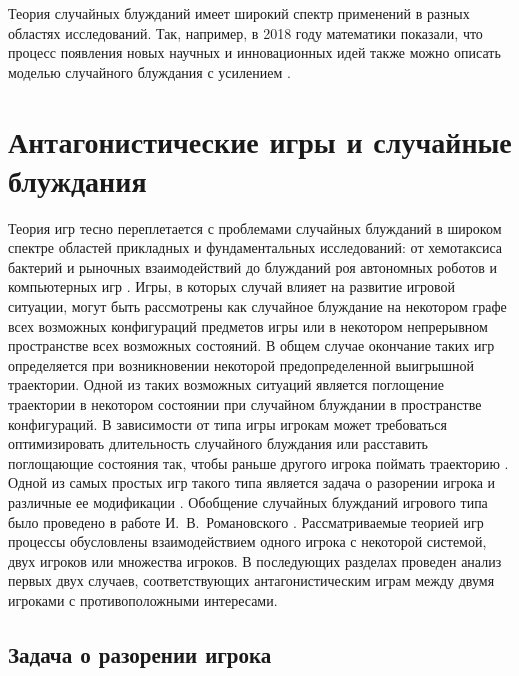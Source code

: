 Теория случайных блужданий имеет широкий спектр применений в разных областях исследований. Так, например, в 2018 году математики показали, что процесс появления новых научных и инновационных идей также можно описать моделью случайного блуждания с усилением \cite{iacopini_network_2018}.

\section{Антагонистические игры и случайные блуждания}\label{sec:ch1/sec3}

Теория игр тесно переплетается с проблемами случайных блужданий в широком спектре областей прикладных и фундаментальных исследований: от хемотаксиса бактерий \cite{zaburdaev_levy_2015,bib1,bib2} и рыночных взаимодействий \cite{li_evolutionary_2013,friedman_towards_2001} до блужданий роя автономных роботов \cite{marques_particle_2006,xiong_intelligent_2008} и компьютерных игр \cite{outlaw_markov_2016,dankel_long_2004,dshalalow_random_2008}. Игры, в которых случай влияет на развитие игровой ситуации, могут быть рассмотрены как случайное блуждание на некотором графе всех возможных конфигураций предметов игры или в некотором непрерывном пространстве всех возможных состояний. В общем случае окончание таких игр определяется при возникновении некоторой предопределенной выигрышной траектории. Одной из таких возможных ситуаций является поглощение траектории в некотором состоянии при случайном блуждании в пространстве конфигураций. В зависимости от типа игры игрокам может требоваться оптимизировать длительность случайного блуждания или расставить поглощающие состояния так, чтобы раньше другого игрока поймать траекторию \cite{baldi_intransitiveness_2020}. Одной из самых простых игр такого типа является задача о разорении игрока \cite{feller_introduction_1968} и различные ее модификации \cite{baldi_intransitiveness_2020,cencetti_second_2016,kittas_trapping_2008,lee_random-walk_1989}. Обобщение случайных блужданий игрового типа было проведено в работе И.~В.~Романовского \cite{romanovsky_1961}. Рассматриваемые теорией игр процессы обусловлены взаимодействием одного игрока с некоторой системой, двух игроков или множества игроков. В последующих разделах проведен анализ первых двух случаев, соответствующих антагонистическим играм между двумя игроками с противоположными интересами.

\subsection{Задача о разорении игрока}\label{subsec:ch1/sec3/sub1}

